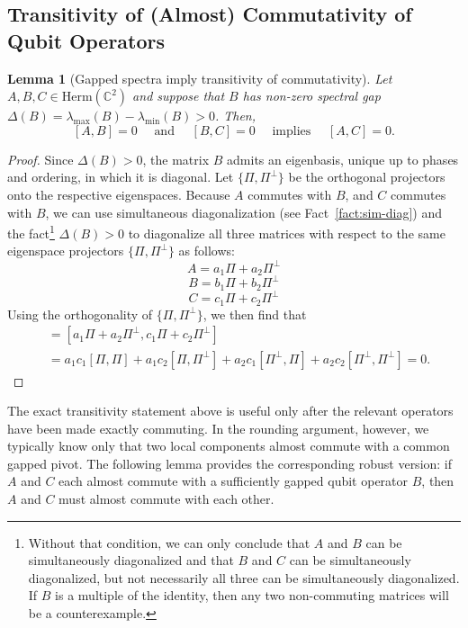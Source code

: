 \documentclass[a4paper,onecolumn,11pt]{quantumarticle}
\theoremstyle{plain}
\newtheorem{lemma}[theorem]{Lemma}
\begin{document}
\subsection{Transitivity of (Almost) Commutativity of Qubit Operators}

\begin{lemma}[Gapped spectra imply transitivity of commutativity]\label{lem:transitivity}
Let $A,B,C \in \mathrm{Herm}(\mathbb{C}^{2})$ and suppose that $B$ has non-zero spectral gap $\Delta(B)=\lambda_{\max}(B) - \lambda_{\min}(B) > 0$. Then, 
$$
[A,B] = 0 \quad \text{ and } \quad [B,C] = 0 \quad \text{ implies } \quad [A,C]=0.
$$
\end{lemma}
\begin{proof}
Since $\Delta(B) > 0$, the matrix $B$ admits an eigenbasis, unique up to phases and ordering, in which it is diagonal. Let $\{\Pi, \Pi^\perp\}$ be the orthogonal projectors onto the respective eigenspaces.
Because $A$ commutes with $B$, and $C$ commutes with $B$, we can use simultaneous diagonalization (see Fact~\ref{fact:sim-diag}) and the fact\footnote{Without that condition, we can only conclude that $A$ and $B$ can be simultaneously diagonalized and that $B$ and $C$ can be simultaneously diagonalized, but not necessarily all three can be simultaneously diagonalized. If $B$ is a multiple of the identity, then any two non-commuting matrices will be a counterexample.} $\Delta(B) > 0$ to diagonalize all three matrices with respect to the same eigenspace projectors $\{\Pi, \Pi^\perp\}$ as follows:
\begin{equation}
    A = a_1 \Pi + a_2 \Pi^\bot
\end{equation}
\begin{equation}
    B = b_1 \Pi + b_2 \Pi^\bot
\end{equation}
\begin{equation}
    C = c_1 \Pi + c_2 \Pi^\bot
\end{equation}
Using the orthogonality of $\{\Pi, \Pi^\perp\}$, we then find that
\begin{align*}
    [A, C] &= \left[a_1 \Pi + a_2 \Pi^\bot,  c_1 \Pi + c_2 \Pi^\bot\right]\\
    &= a_1c_1 [\Pi, \Pi] + a_1 c_2 [\Pi, \Pi^\bot] + a_2 c_1 [\Pi^\bot, \Pi] + a_2 c_2 [\Pi^\bot, \Pi^\bot] = 0.
\end{align*}
\end{proof}

The exact transitivity statement above is useful only after the relevant
operators have been made exactly commuting.  In the rounding argument,
however, we typically know only that two local components almost commute
with a common gapped pivot.  The following lemma provides the corresponding
robust version: if $A$ and $C$ each almost commute with a sufficiently
gapped qubit operator $B$, then $A$ and $C$ must almost commute with each
other. 
\end{document}
